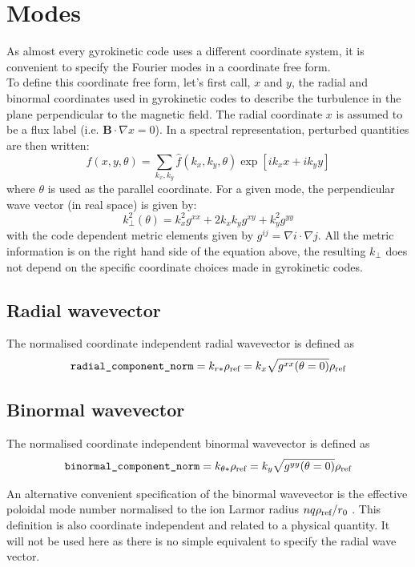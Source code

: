 \documentclass[a4paper]{report}
\begin{document}
\section{Modes}
As almost every gyrokinetic code uses a different coordinate system, it is convenient to specify the Fourier modes in a coordinate free form.\\
To define this coordinate free form, let's first call, $x$ and $y$, the radial and binormal coordinates used in gyrokinetic codes to describe the turbulence in the plane perpendicular to the magnetic field. The radial coordinate $x$ is assumed to be a flux label (i.e. $\mathbf{B}\cdot \nabla x =0$).
In a spectral representation, perturbed quantities are then written:
\begin{equation}
 f(x,y,\theta) = \sum_{k_x,k_y} \hat{f}(k_x,k_y,\theta)\exp[ik_x x + ik_y y] 
\end{equation}
where $\theta$ is used as the parallel coordinate.
For a given mode, the perpendicular wave vector (in real space) is given by:
\begin{equation}
 k_\perp^2(\theta) = k_x^2 g^{xx} + 2k_xk_y g^{xy} + k_y^2g^{yy}
\end{equation}
with the code dependent metric elements given by $g^{ij}=\nabla i \cdot \nabla j$. All the metric information is on the right hand side of the equation above, the resulting $k_\perp$ does not depend on the specific coordinate choices made in gyrokinetic codes.

\subsection{Radial wavevector} \label{sec:kx}
The normalised coordinate independent radial wavevector is defined as
\begin{equation}
 \texttt{radial\_component\_norm}=k_{r*}\rho_{\textrm{ref}} = k_x \sqrt{g^{xx}(\theta=0)} \rho_{\textrm{ref}}
\end{equation}

\subsection{Binormal wavevector} \label{sec:ky}
The normalised coordinate independent binormal wavevector is defined as
\begin{equation}
 \texttt{binormal\_component\_norm}=k_{\theta*}\rho_{\textrm{ref}} = k_y \sqrt{g^{yy}(\theta=0)} \rho_{\textrm{ref}}
\end{equation}

An alternative convenient specification of the binormal wavevector is the effective poloidal mode number normalised to the ion Larmor radius  $nq\rho_{\textrm{ref}}/r_0$  \cite{Merlo:PoP2016}. This definition is also coordinate independent and related to a physical quantity. It will not be used here as there is no simple equivalent to specify the radial wave vector.
\end{document}
